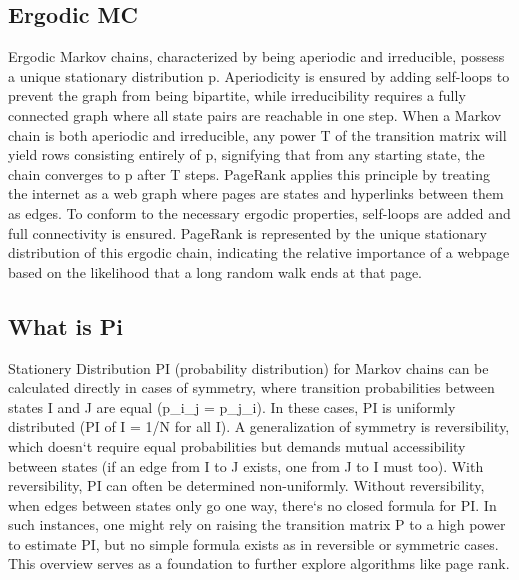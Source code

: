 \subsection*{Ergodic MC}
Ergodic Markov chains, characterized by being aperiodic and irreducible, possess a unique stationary distribution p.
Aperiodicity is ensured by adding self-loops to prevent the graph from being bipartite, while irreducibility requires a fully connected graph where all state pairs are reachable in one step.
When a Markov chain is both aperiodic and irreducible, any power T of the transition matrix will yield rows consisting entirely of p, signifying that from any starting state, the chain converges to p after T steps.
PageRank applies this principle by treating the internet as a web graph where pages are states and hyperlinks between them as edges.
To conform to the necessary ergodic properties, self-loops are added and full connectivity is ensured.
PageRank is represented by the unique stationary distribution of this ergodic chain, indicating the relative importance of a webpage based on the likelihood that a long random walk ends at that page.

\subsection*{What is Pi}
Stationery Distribution PI (probability distribution) for Markov chains can be calculated directly in cases of symmetry, where transition probabilities between states I and J are equal (p\_i\_j = p\_j\_i).
In these cases, PI is uniformly distributed (PI of I = 1/N for all I).
A generalization of symmetry is reversibility, which doesn`t require equal probabilities but demands mutual accessibility between states (if an edge from I to J exists, one from J to I must too).
With reversibility, PI can often be determined non-uniformly.
Without reversibility, when edges between states only go one way, there`s no closed formula for PI\@.
In such instances, one might rely on raising the transition matrix P to a high power to estimate PI, but no simple formula exists as in reversible or symmetric cases.
This overview serves as a foundation to further explore algorithms like page rank.

